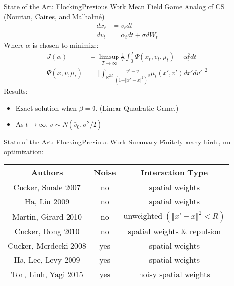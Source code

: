 \documentclass{beamer}
\begin{document}
\begin{frame}{State of the Art: Flocking}{Previous Work}
	Mean Field Game Analog of CS (Nourian, Caines, and Malhalm\'{e})
				\begin{equation}
				\begin{split}
				dx_t&=v_tdt\\
				dv_t&=\alpha_tdt+\sigma dW_t
				\end{split}
				\end{equation}
				Where $\alpha$ is chosen to minimize:
				\begin{equation}
				\begin{split}
				J(\alpha)&=\limsup_{T \rightarrow \infty} \frac{1}{T} \int_0^T \Psi(x_t,v_t,\mu_t)+\alpha_t^2 dt \\
				\Psi(x,v,\mu_t)&=\Vert\int_{\mathbb{R}^{2d}}\frac{v'-v}{(1+\Vert x'-x \Vert^2)^\beta}\mu_t(x',v')dx'dv' \Vert^2
				\end{split}
				\end{equation}
	Results:
	\begin{itemize}
		\item {
			Exact solution when $\beta=0$. (Linear Quadratic Game.)
		}
		\item {
			As $t\rightarrow \infty$, $v \sim N(\bar{v}_0,\sigma^2/2)$
		}
	\end{itemize}
\end{frame}

\begin{frame}{State of the Art: Flocking}{Previous Work Summary}
	Finitely many birds, no optimization:
	\begin{center}
	\begin{tabular}{|c|c|c|}
	 \hline
	 Authors & Noise & Interaction Type  \\ \hline
	 Cucker, Smale 2007& no & spatial weights \\ \hline
	 Ha, Liu 2009& no&spatial weights \\ \hline
	 Martin, Girard 2010 & no&unweighted $(\Vert x'-x\Vert^2 <R)$ \\ \hline
	 Cucker, Dong 2010 & no&spatial weights \& repulsion \\ \hline
	 Cucker, Mordecki 2008 & yes&spatial weights \\ \hline
	 Ha, Lee, Levy 2009 & yes&spatial weights \\ \hline
	 Ton, Linh, Yagi 2015 & yes& noisy spatial weights \\
	 \hline
	\end{tabular}
	\end{center}
\end{frame}
\end{document}
